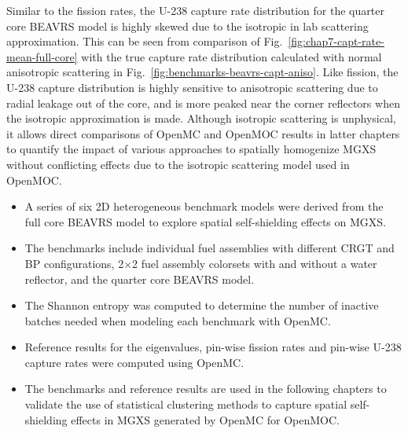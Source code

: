 Similar to the fission rates, the U-238 capture rate distribution for the quarter core \ac{BEAVRS} model is highly skewed due to the isotropic in lab scattering approximation. This can be seen from comparison of Fig.~\ref{fig:chap7-capt-rate-mean-full-core} with the true capture rate distribution calculated with normal anisotropic scattering in Fig.~\ref{fig:benchmarks-beavrs-capt-aniso}. Like fission, the U-238 capture distribution is highly sensitive to anisotropic scattering due to radial leakage out of the core, and is more peaked near the corner reflectors when the isotropic approximation is made. Although isotropic scattering is unphysical, it allows direct comparisons of OpenMC and OpenMOC results in latter chapters to quantify the impact of various approaches to spatially homogenize \ac{MGXS} without conflicting effects due to the isotropic scattering model used in OpenMOC.



\vfill
\begin{highlightsbox}[frametitle=Highlights]
\begin{itemize}
  \item A series of six 2D heterogeneous benchmark models were derived from the full core \ac{BEAVRS} model to explore spatial self-shielding effects on \ac{MGXS}.
  \item The benchmarks include individual fuel assemblies with different \ac{CRGT} and \ac{BP} configurations, 2$\times$2 fuel assembly colorsets with and without a water reflector, and the quarter core \ac{BEAVRS} model.
  \item The Shannon entropy was computed to determine the number of inactive batches needed when modeling each benchmark with OpenMC.
  \item Reference results for the eigenvalues, pin-wise fission rates and pin-wise U-238 capture rates were computed using OpenMC.
  \item The benchmarks and reference results are used in the following chapters to validate the use of statistical clustering methods to capture spatial self-shielding effects in \ac{MGXS} generated by OpenMC for OpenMOC.
\end{itemize}
\end{highlightsbox}
\vfill